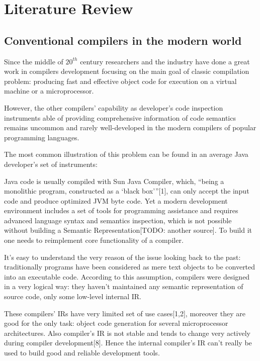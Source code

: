 \chapter{Literature Review}
\label{chap:lr}

\section{Conventional compilers in the modern world}
\label{sec:review_1}

Since the middle of $20^{th}$ century researchers and the industry have done a great
work in compilers development focusing on the main goal of classic compilation
problem: producing fast and effective object code for execution on a virtual
machine or a microprocessor.


However, the other compilers’ capability as developer’s code inspection
instruments able of providing comprehensive information of code semantics
remains uncommon and rarely well-developed in the modern compilers of
popular programming languages.


The most common illustration of this problem can be found in an average Java
developer’s set of instruments:

Java code is usually compiled with Sun Java Compiler, which, “being a
monolithic program, constructed as a ‘black box’”[1], can only accept the input
code and produce optimized JVM byte code.
\newpage
Yet a modern development environment includes a set of tools for
programming assistance and requires advanced language syntax and
semantics inspection, which is not possible without building a Semantic
Representation[TODO: another source]. To build it one needs to reimplement core functionality of a
compiler.


It’s easy to understand the very reason of the issue looking back to the past:
traditionally programs have been considered as mere text objects to be
converted into an executable code. According to this assumption, compilers
were designed in a very logical way: they haven’t maintained any semantic
representation of source code, only some low-level internal IR.


These compilers’ IRs have very limited set of use cases[1,2], moreover they are
good for the only task: object code generation for several microprocessor
architectures. Also compiler’s IR is not stable and tends to change very actively
during compiler development[8]. Hence the internal compiler’s IR can’t really
be used to build good and reliable development tools.


